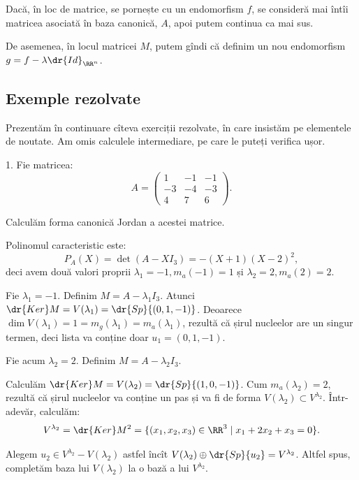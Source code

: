 \begin{remark}\label{rk:jordan-morf}
  Dacă, în loc de matrice, se pornește cu un endomorfism $ f $, se consideră
  mai întîi matricea asociată în baza canonică, $ A $, apoi putem continua
  ca mai sus.

  De asemenea, în locul matricei $ M $, putem gîndi că definim un nou
  endomorfism $ g = f - \lambda \dr{Id}_{\RR^n} $.
\end{remark}

\subsection{Exemple rezolvate}

Prezentăm în continuare cîteva exerciții rezolvate, în care insistăm
pe elementele de noutate. Am omis calculele intermediare, pe care le
puteți verifica ușor.

1. Fie matricea:
\[
  A = \begin{pmatrix}
    1 & -1 & -1 \\
    -3 & -4 & -3 \\
    4 & 7 & 6
  \end{pmatrix}.
\]

Calculăm forma canonică Jordan a acestei matrice.

Polinomul caracteristic este:
\[
  P_A(X) = \det(A - XI_3) = -(X + 1)(X - 2)^2,
\]
deci avem două valori proprii $ \lambda_1 = -1, m_a(-1) = 1 $ și
$ \lambda_2 = 2, m_a(2) = 2 $.

Fie $ \lambda_1 = -1 $. Definim $ M = A - \lambda_1 I_3 $.
Atunci $ \dr{Ker}M = V(\lambda_1) = \dr{Sp} \{(0, 1, -1)\} $. Deoarece
$ \dim V(\lambda_1) = 1 = m_g(\lambda_1) = m_a(\lambda_1) $, rezultă
că șirul nucleelor are un singur termen, deci lista va conține
doar $ u_1 = (0, 1, -1) $.

Fie acum $ \lambda_2 = 2 $. Definim $ M = A - \lambda_2 I_3 $.

Calculăm $ \dr{Ker}M = V(\lambda_2) = \dr{Sp} \{(1, 0, -1) \} $.
Cum $ m_a(\lambda_2) = 2 $, rezultă că șirul nucleelor va conține un pas și
va fi de forma $ V(\lambda_2) \subset V^{\lambda_2} $. Într-adevăr, calculăm:
\[
  V^{\lambda_2} = \dr{Ker}M^2 = \{ (x_1, x_2, x_3) \in \RR^3 \mid x_1 + 2x_2 + x_3 = 0 \}.
\]

Alegem $ u_2 \in V^{\lambda_2} - V(\lambda_2) $ astfel încît
$ V(\lambda_2) \oplus \dr{Sp} \{ u_2 \} = V^{\lambda_2} $. Altfel spus,
completăm baza lui $ V(\lambda_2) $ la o bază a lui $ V^{\lambda_2} $.


